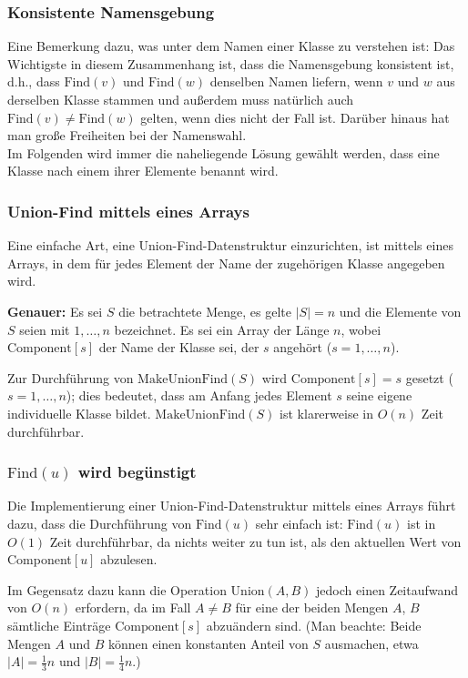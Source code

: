 \documentclass[smaller,xcolor=dvipsnames]{beamer}
\newcommand{\opfind}{\text{Find}}
\newcommand{\opunion}{\text{Union}}
\newcommand{\opmakeunionfind}{\text{MakeUnionFind}}
\newcommand{\component}{\text{Component}}
\begin{document}
\begin{frame}
\frametitle{Konsistente Namensgebung}
Eine Bemerkung dazu, was unter dem \alert{Namen einer Klasse} zu verstehen ist: Das Wichtigste in diesem Zusammenhang ist, dass die Namensgebung \alert{konsistent} ist, d.h., dass $\opfind{(v)}$ und $\opfind{(w)}$ denselben Namen liefern, wenn $v$ und $w$ aus derselben Klasse stammen und außerdem muss natürlich auch $\opfind{(v)} \neq \opfind{(w)}$ gelten, wenn dies nicht der Fall ist. Darüber hinaus hat man große Freiheiten bei der Namenswahl. \\ \medskip
\alert{Im Folgenden wird immer die naheliegende Lösung gewählt werden, dass eine Klasse nach einem ihrer Elemente benannt wird.}
\end{frame}

\begin{frame}
\frametitle{Union-Find mittels eines Arrays}
 Eine einfache Art, eine Union-Find-Datenstruktur einzurichten, ist mittels eines Arrays, in dem für jedes Element der Name der zugehörigen Klasse angegeben wird. \\ \medskip
 
 \textbf{Genauer:} Es sei $S$ die betrachtete Menge, es gelte $|S|=n$ und die Elemente von $S$ seien mit $1,\ldots,n$ bezeichnet. Es sei \structure{$\component$} ein Array der Länge $n$, wobei $\component[s]$ der Name der Klasse sei, der $s$ angehört ($s=1,\ldots,n$). \\ \medskip
 
 Zur Durchführung von $\opmakeunionfind{(S)}$ wird $\component[s]=s$ gesetzt ($s=1,\ldots,n$); dies bedeutet, dass am Anfang jedes Element $s$ seine eigene individuelle Klasse bildet. $\opmakeunionfind{(S)}$ ist klarerweise in $O(n)$ Zeit durchführbar.
\end{frame}

\begin{frame}
\frametitle{$\opfind(u)$ wird begünstigt}
 Die Implementierung einer Union-Find-Datenstruktur mittels eines Arrays führt dazu, dass die Durch\-füh\-rung von $\opfind{(u)}$ sehr einfach ist: \alert{$\opfind{(u)}$ ist in $O(1)$ Zeit durchführbar, da nichts weiter zu tun ist, als den aktuellen Wert von Component$[u]$ abzulesen}. \\ \medskip

\alert{Im Gegensatz dazu kann die Operation $\opunion{(A,B)}$ jedoch einen Zeitaufwand von $O(n)$ erfordern}, da im Fall $A \neq B$ für eine der beiden Mengen $A$, $B$ sämtliche Einträge $\component[s]$ abzuändern sind. (Man beachte: Beide Mengen $A$ und $B$ können einen konstanten Anteil von $S$ ausmachen, etwa $|A| = \frac{1}{3}n$ und $|B| = \frac{1}{4}n$.)
\end{frame}
\end{document}
